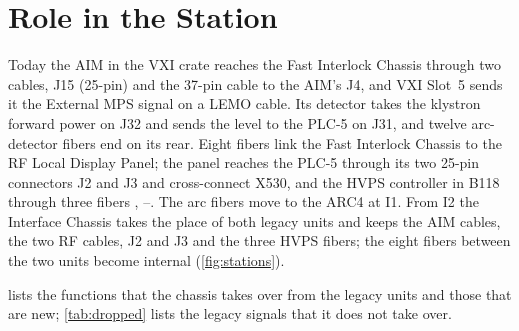 \section{Role in the Station}\label{sec:role}

Today the AIM in the VXI crate reaches the Fast Interlock Chassis through two cables,
J15 (25-pin) and the 37-pin cable to the AIM's J4, and VXI Slot~5 sends it the
External MPS signal on a LEMO cable. Its detector takes the klystron forward power on
J32 and sends the level to the PLC-5 on J31, and twelve arc-detector fibers end on its
rear. Eight fibers link the Fast Interlock Chassis to
the RF Local Display Panel; the panel reaches the PLC-5 through its two 25-pin
connectors J2 and J3 and cross-connect X530, and the HVPS controller in B118 through
three fibers , --. The arc fibers move to the ARC4 at I1. From I2 the
Interface Chassis takes the place of both legacy units and keeps the AIM cables, the
two RF cables, J2 and J3 and the three HVPS fibers; the
eight fibers between the two units become internal (\cref{fig:stations}).

 lists the functions that the chassis takes over from the legacy
units and those that are new; \cref{tab:dropped} lists the legacy signals that it does
not take over.

